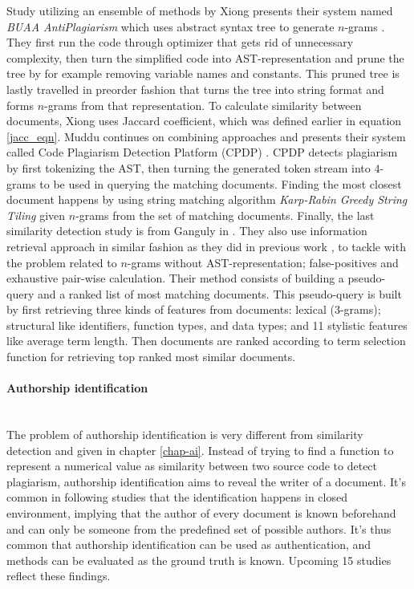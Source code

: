 Study utilizing an ensemble of methods by Xiong \etal presents their system named \textit{BUAA AntiPlagiarism} which uses abstract syntax tree to generate $n$-grams \cite{BUAA2009}. They first run the code through optimizer that gets rid of unnecessary complexity, then turn the simplified code into AST-representation and prune the tree by for example removing variable names and constants. This pruned tree is lastly travelled in preorder fashion that turns the tree into string format and forms $n$-grams from that representation. To calculate similarity between documents, Xiong \etal uses Jaccard coefficient, which was defined earlier in equation \ref{jacc_eqn}. Muddu \etal continues on combining approaches and presents their system called Code Plagiarism Detection Platform (CPDP) \cite{CPDPPD2013}. CPDP detects plagiarism by first tokenizing the AST, then turning the generated token stream into $4$-grams to be used in querying the matching documents. Finding the most closest document happens by using string matching algorithm \emph{Karp-Rabin Greedy String Tiling} given $n$-grams from the set of matching documents. Finally, the last similarity detection study is from Ganguly \etal in \cite{RCISCP2017}. They also use information retrieval approach in similar fashion as they did in previous work \cite{AIR2015}, to tackle with the problem related to $n$-grams without AST-representation; false-positives and exhaustive pair-wise calculation. Their method consists of building a pseudo-query and a ranked list of most matching documents. This pseudo-query is built by first retrieving three kinds of features from documents: lexical (3-grams); structural like identifiers, function types, and data types; and 11 stylistic features like average term length. Then documents are ranked according to term selection function for retrieving top ranked most similar documents. 

\paragraph{Authorship identification}\mbox{}\\
The problem of authorship identification is very different from similarity detection and given in chapter \ref{chap-ai}. Instead of trying to find a function to represent a numerical value as similarity between two source code to detect plagiarism, authorship identification aims to reveal the writer of a document. It's common in following studies that the identification happens in closed environment, implying that the author of every document is known beforehand and can only be someone from the predefined set of possible authors. It's thus common that authorship identification can be used as authentication, and methods can be evaluated as the ground truth is known. Upcoming 15 studies reflect these findings.


